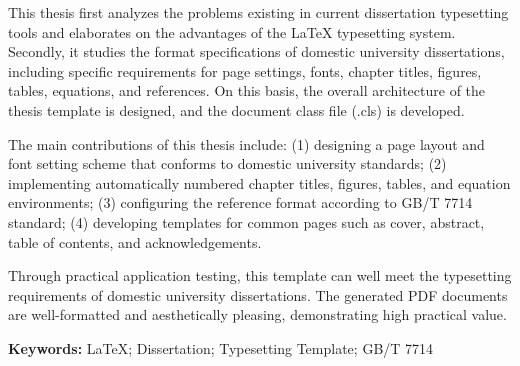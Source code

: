 This thesis first analyzes the problems existing in current dissertation typesetting tools and elaborates on the advantages of the LaTeX typesetting system. Secondly, it studies the format specifications of domestic university dissertations, including specific requirements for page settings, fonts, chapter titles, figures, tables, equations, and references. On this basis, the overall architecture of the thesis template is designed, and the document class file (.cls) is developed.

The main contributions of this thesis include: (1) designing a page layout and font setting scheme that conforms to domestic university standards; (2) implementing automatically numbered chapter titles, figures, tables, and equation environments; (3) configuring the reference format according to GB/T 7714 standard; (4) developing templates for common pages such as cover, abstract, table of contents, and acknowledgements.

Through practical application testing, this template can well meet the typesetting requirements of domestic university dissertations. The generated PDF documents are well-formatted and aesthetically pleasing, demonstrating high practical value.

\vspace{1cm}
\noindent\textbf{Keywords:} LaTeX; Dissertation; Typesetting Template; GB/T 7714
